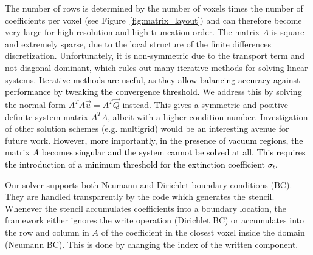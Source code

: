 \documentclass{egpubl}
\newcommand{\icaption}[1]{\caption{#1}}
\newcommand{\rev}[1]{\textcolor{black}{#1}}
\begin{document}
The number of rows is determined by the number of voxels times the number of coefficients per voxel (see Figure~\ref{fig:matrix_layout}) and can therefore become very large for high resolution and high truncation order. The matrix $A$ is square and extremely sparse, due to the local structure of the finite differences discretization. Unfortunately, it is non-symmetric due to the transport term and not diagonal dominant, which rules out many \rev{iterative} methods for solving linear systems. \rev{Iterative methods are useful, as they allow balancing accuracy against performance by tweaking the convergence threshold.} We address this by solving the normal form $A^TA\vec{u}=A^T\vec{Q}$ instead. This gives a symmetric and positive definite system matrix $A^TA$, albeit with a higher condition number. Investigation of other solution schemes (e.g. multigrid) would be an interesting avenue for future work. \rev{However, more importantly, in the presence of vacuum regions, the matrix $A$ becomes singular and the system cannot be solved at all. This requires the introduction of a minimum threshold for the extinction coefficient $\sigma_t$.}

Our solver supports both Neumann and Dirichlet boundary conditions (BC). They are handled transparently by the code which generates the stencil. Whenever the stencil accumulates coefficients into a boundary location, the framework either ignores the write operation (Dirichlet BC) or accumulates into the row and column in $A$ of the coefficient in the closest voxel inside the domain (Neumann BC). This is done by changing the index of the written component.


\end{document}
